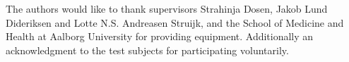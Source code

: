 The authors would like to thank supervisors Strahinja Dosen, Jakob Lund Dideriksen and Lotte N.S. Andreasen Struijk, and the School of Medicine and Health at Aalborg University for providing equipment. Additionally an acknowledgment to the test subjects for participating voluntarily.